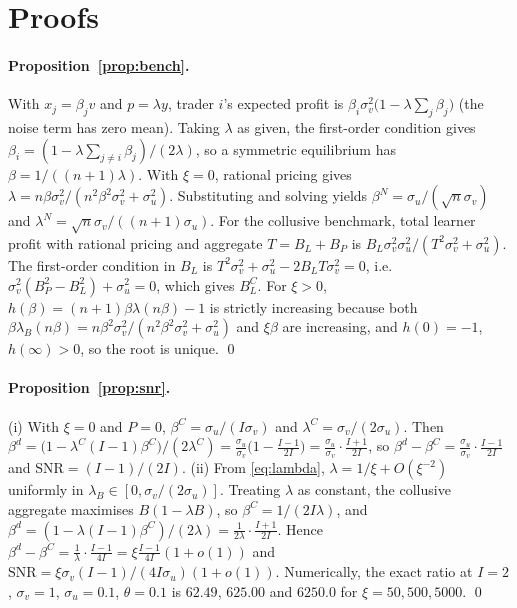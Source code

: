 \section{Proofs}
\label{app:proofs}

\paragraph{Proposition~\ref{prop:bench}.} With $x_j=\beta_j v$ and
$p=\lambda y$, trader $i$'s expected profit is
$\beta_i\sigma_v^2\big(1-\lambda\sum_j\beta_j\big)$ (the noise term has zero
mean). Taking $\lambda$ as given, the first-order condition gives
$\beta_i=(1-\lambda\sum_{j\ne i}\beta_j)/(2\lambda)$, so a symmetric equilibrium
has $\beta=1/((n+1)\lambda)$. With $\xi=0$, rational pricing gives
$\lambda=n\beta\sigma_v^2/(n^2\beta^2\sigma_v^2+\sigma_u^2)$. Substituting and
solving yields $\beta^N=\sigma_u/(\sqrt n\sigma_v)$ and
$\lambda^N=\sqrt n\sigma_v/((n+1)\sigma_u)$. For the collusive benchmark, total
learner profit with rational pricing and aggregate $T=B_L+B_P$ is
$B_L\sigma_v^2\sigma_u^2/(T^2\sigma_v^2+\sigma_u^2)$. The first-order condition
in $B_L$ is $T^2\sigma_v^2+\sigma_u^2-2B_LT\sigma_v^2=0$, i.e.
$\sigma_v^2(B_P^2-B_L^2)+\sigma_u^2=0$, which gives $B_L^C$. For $\xi>0$,
$h(\beta)=(n+1)\beta\lambda(n\beta)-1$ is strictly increasing because both
$\beta\lambda_B(n\beta)=n\beta^2\sigma_v^2/(n^2\beta^2\sigma_v^2+\sigma_u^2)$ and
$\xi\beta$ are increasing, and $h(0)=-1$, $h(\infty)>0$, so the root is
unique. \qed

\paragraph{Proposition~\ref{prop:snr}.} (i) With $\xi=0$ and $P=0$,
$\beta^C=\sigma_u/(I\sigma_v)$ and $\lambda^C=\sigma_v/(2\sigma_u)$. Then
$\beta^d=\big(1-\lambda^C(I-1)\beta^C\big)/(2\lambda^C)
=\frac{\sigma_u}{\sigma_v}\big(1-\tfrac{I-1}{2I}\big)
=\frac{\sigma_u}{\sigma_v}\cdot\frac{I+1}{2I}$,
so $\beta^d-\beta^C=\frac{\sigma_u}{\sigma_v}\cdot\frac{I-1}{2I}$ and
$\mathrm{SNR}=(I-1)/(2I)$. (ii) From \eqref{eq:lambda},
$\lambda=1/\xi+O(\xi^{-2})$ uniformly in $\lambda_B\in[0,\sigma_v/(2\sigma_u)]$.
Treating $\lambda$ as constant, the collusive aggregate maximises
$B(1-\lambda B)$, so $\beta^C=1/(2I\lambda)$, and
$\beta^d=(1-\lambda(I-1)\beta^C)/(2\lambda)=\frac{1}{2\lambda}\cdot\frac{I+1}{2I}$.
Hence $\beta^d-\beta^C=\frac{1}{\lambda}\cdot\frac{I-1}{4I}=\xi\frac{I-1}{4I}(1+o(1))$
and $\mathrm{SNR}=\xi\sigma_v(I-1)/(4I\sigma_u)(1+o(1))$. Numerically, the exact
ratio at $I=2$, $\sigma_v=1$, $\sigma_u=0.1$, $\theta=0.1$ is $62.49$, $625.00$
and $6250.0$ for $\xi=50,500,5000$. \qed


